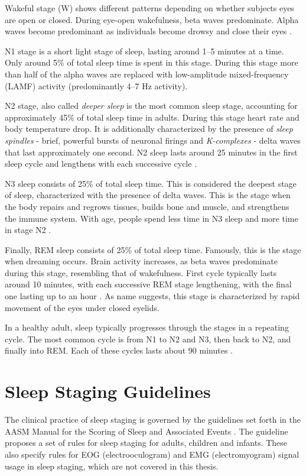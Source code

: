 Wakeful stage (W) shows different patterns depending on whether subjects eyes are open or closed.
During eye-open wakefulness, beta waves predominate. Alpha waves become predominant as individuals
become drowsy and close their eyes \cite{Patel2025Physiology}.

N1 stage is a short light stage of sleep, lasting around 1–5 minutes at a time. Only around 5\% of total sleep time is spent in this stage.
During this stage more than half of the alpha waves are replaced with low-amplitude mixed-frequency (LAMF) activity (predominantly 4–7 Hz activity).

N2 stage, also called \textit{deeper sleep} is the most common sleep stage, accounting for approximately 45\% of total sleep time in adults.
During this stage heart rate and body temperature drop. It is additionally characterized by the presence of \textit{sleep spindles} - 
brief, powerful bursts of neuronal firings and \textit{K-complexes} - delta waves that last approximately one second.
N2 sleep lasts around 25 minutes in the first sleep cycle and lengthens with each successive cycle \cite{Patel2025Physiology}.

N3 sleep consists of 25\% of total sleep time. This is considered the deepest stage of sleep, 
characterized with the presence of delta waves. This is the stage when the body repairs and 
regrows tissues, builds bone and muscle, and strengthens the immune system.
With age, people spend less time in N3 sleep and more time in stage N2 \cite{Patel2025Physiology}.

Finally, REM sleep consists of 25\% of total sleep time. Famously,
this is the stage when dreaming occurs. Brain activity increases, as 
beta waves predominate during this stage, resembling that of wakefulness.
First cycle typically lasts around 10 minutes, with each successive REM stage lengthening,
with the final one lasting up to an hour \cite{Patel2025Physiology}.
As name suggests, this stage is characterized by rapid movement of the eyes under closed eyelids.

In a healthy adult, sleep typically progresses through the stages in a repeating cycle. The most common cycle is
from N1 to N2 and N3, then back to N2, and finally into REM.
Each of these cycles lasts about 90 minutes \cite{Patel2025Physiology}.

\section{Sleep Staging Guidelines}
The clinical practice of sleep staging is governed by the guidelines set forth in the AASM Manual for the Scoring of Sleep and Associated Events \cite{AASM}.
The guideline proposes a set of rules for sleep staging for adults, children and infants. These also specify rules 
for EOG (electrooculogram) and EMG (electromyogram) signal usage in sleep staging, which are not covered in this thesis.

